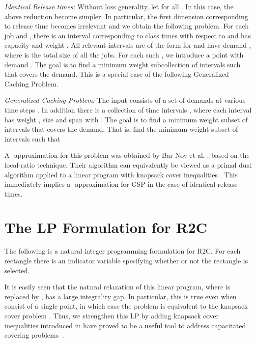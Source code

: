 \documentclass[11pt]{article}
\begin{document}
\bigskip

{\em Identical Release times:}
Without loss generality, let  for all . In this case, the above reduction become simpler. In particular, the first dimension corresponding to release time becomes irrelevant and we obtain the following problem. For each job  and , there is an interval  corresponding to class  times with respect to  and has capacity  and weight .
All relevant intervals  are of the form 
 for  and have demand , where  is the total size of all the jobs. 
For each such , we introduce a point  with demand .
The goal is to find a minimum weight subcollection of intervals  such that covers the demand.
This is a special case of the following Generalized Caching Problem.

\medskip
{\em Generalized Caching Problem:} The input consists of a set of demands  at various time steps . In addition there is a collection of 
time intervals  , where each interval  has weight , size  and span
 with . The goal is to find a minimum weight subset of intervals that covers the demand. That is, find the minimum weight subset of intervals  such that 


A -approximation for this problem was obtained by Bar-Noy et al. \cite{BBF}, based
on the local-ratio technique. Their algorithm can equivalently be viewed as a primal dual algorithm
applied to a linear program with knapsack cover inequalities \cite{BR}.
This immediately implies a -approximation for GSP in the case of identical release times.


\section{The LP Formulation for R2C}
\label{sec:preliminaries}

The following is a natural integer programming formulation for
R2C. For each rectangle  there is an indicator variable
 specifying whether or not the rectangle  is selected.



It is easily seen 
that the natural relaxation of this linear program, where  
is replaced by , has a
large integrality gap. In particular, this is true even when  consist of a single point, in which case the problem is equivalent to the knapsack cover problem \cite{CarrFLP00}.
Thus, we strengthen this LP by adding knapsack cover inequalities introduced in \cite{CarrFLP00}
have proved 
to be a useful tool to address capacitated covering problems~\cite{gencaching, shmoys, sviri, BansalGK2010, CGK10}. 
\end{document}
